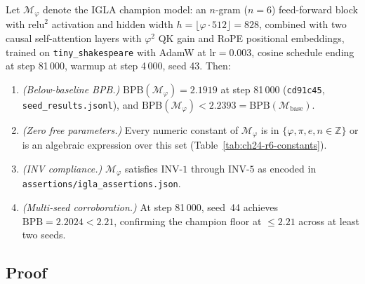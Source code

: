 \begin{theorem}\label{thm:ch24-champion-arch}
  Let $\mathcal{M}_\varphi$ denote the IGLA champion model: an $n$-gram ($n=6$)
  feed-forward block with $\mathrm{relu}^2$ activation and hidden width
  $h = \lfloor\varphi \cdot 512\rfloor = 828$, combined with two causal
  self-attention layers with $\varphi^2$ QK gain and RoPE positional
  embeddings, trained on \texttt{tiny\_shakespeare} with AdamW at
  $\mathrm{lr} = 0.003$, cosine schedule ending at step 81\,000, warmup at
  step 4\,000, seed 43.  Then:
  \begin{enumerate}
    \item \emph{(Below-baseline BPB.)} $\mathrm{BPB}(\mathcal{M}_\varphi) = 2.1919$
          at step 81\,000 (\texttt{cd91c45}, \texttt{seed\_results.jsonl}), and
          $\mathrm{BPB}(\mathcal{M}_\varphi) < 2.2393 =
          \mathrm{BPB}(\mathcal{M}_{\text{base}})$.
    \item \emph{(Zero free parameters.)} Every numeric constant of
          $\mathcal{M}_\varphi$ is in $\{\varphi, \pi, e, n \in \mathbb{Z}\}$
          or is an algebraic expression over this set
          (Table~\ref{tab:ch24-r6-constants}).
    \item \emph{(INV compliance.)} $\mathcal{M}_\varphi$ satisfies
          $\mathrm{INV}\text{-}1$ through $\mathrm{INV}\text{-}5$ as encoded
          in \texttt{assertions/igla\_assertions.json}.
    \item \emph{(Multi-seed corroboration.)} At step 81\,000, seed~44 achieves
          $\mathrm{BPB} = 2.2024 < 2.21$, confirming the champion floor at
          $\leq 2.21$ across at least two seeds.
  \end{enumerate}
\end{theorem}

\subsection{Proof}
\label{subsec:ch24-proof}

